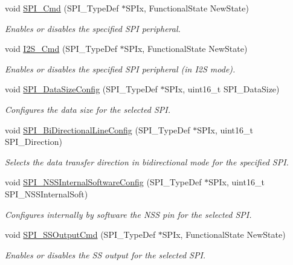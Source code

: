 \begin{DoxyCompactItemize}
void \hyperlink{group___s_p_i_gaa31357879a65ee1ed7223f3b9114dcf3}{S\-P\-I\-\_\-\-Cmd} (S\-P\-I\-\_\-\-Type\-Def $\ast$S\-P\-Ix, Functional\-State New\-State)
\begin{DoxyCompactList}\small\item\em Enables or disables the specified S\-P\-I peripheral. \end{DoxyCompactList}\item 
void \hyperlink{group___s_p_i_gafe061c71bbc5b4224f3f2884dc53739e}{I2\-S\-\_\-\-Cmd} (S\-P\-I\-\_\-\-Type\-Def $\ast$S\-P\-Ix, Functional\-State New\-State)
\begin{DoxyCompactList}\small\item\em Enables or disables the specified S\-P\-I peripheral (in I2\-S mode). \end{DoxyCompactList}\item 
void \hyperlink{group___s_p_i_gafc82e90841d7879535d655c035709cb1}{S\-P\-I\-\_\-\-Data\-Size\-Config} (S\-P\-I\-\_\-\-Type\-Def $\ast$S\-P\-Ix, uint16\-\_\-t S\-P\-I\-\_\-\-Data\-Size)
\begin{DoxyCompactList}\small\item\em Configures the data size for the selected S\-P\-I. \end{DoxyCompactList}\item 
void \hyperlink{group___s_p_i_ga166171c421fc51da7714723524d41b45}{S\-P\-I\-\_\-\-Bi\-Directional\-Line\-Config} (S\-P\-I\-\_\-\-Type\-Def $\ast$S\-P\-Ix, uint16\-\_\-t S\-P\-I\-\_\-\-Direction)
\begin{DoxyCompactList}\small\item\em Selects the data transfer direction in bidirectional mode for the specified S\-P\-I. \end{DoxyCompactList}\item 
void \hyperlink{group___s_p_i_ga56fc508a482f032f9eb80e4c63184126}{S\-P\-I\-\_\-\-N\-S\-S\-Internal\-Software\-Config} (S\-P\-I\-\_\-\-Type\-Def $\ast$S\-P\-Ix, uint16\-\_\-t S\-P\-I\-\_\-\-N\-S\-S\-Internal\-Soft)
\begin{DoxyCompactList}\small\item\em Configures internally by software the N\-S\-S pin for the selected S\-P\-I. \end{DoxyCompactList}\item 
void \hyperlink{group___s_p_i_ga4ec54abdedf6cd17403d853a926d91c1}{S\-P\-I\-\_\-\-S\-S\-Output\-Cmd} (S\-P\-I\-\_\-\-Type\-Def $\ast$S\-P\-Ix, Functional\-State New\-State)
\begin{DoxyCompactList}\small\item\em Enables or disables the S\-S output for the selected S\-P\-I. \end{DoxyCompactList}\item 

\end{DoxyCompactItemize}
